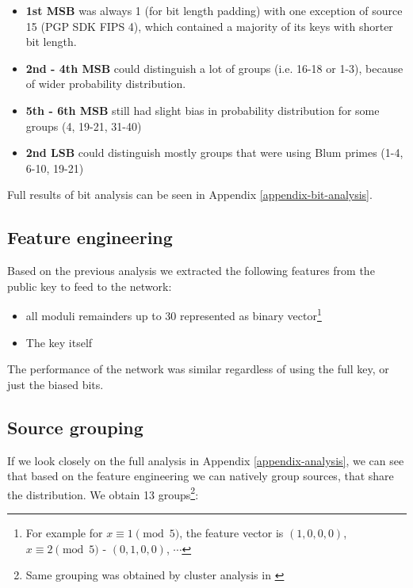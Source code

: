 \begin{itemize}

\item \textbf{1st MSB} was always 1 (for bit length padding) with one exception of source 15 (PGP SDK FIPS 4), which contained a majority of its keys with shorter bit length.

\item \textbf{2nd - 4th MSB} could distinguish a lot of groups (i.e. 16-18 or 1-3), because of wider probability distribution.

\item \textbf{5th - 6th MSB} still had slight bias in probability distribution for some groups (4, 19-21, 31-40)

\item \textbf{2nd LSB} could distinguish mostly groups that were using Blum primes (1-4, 6-10, 19-21)

\end{itemize}

\noindent
Full results of bit analysis can be seen in Appendix \ref{appendix-bit-analysis}.

\subsection{Feature engineering}

\label{feature-engineering}

Based on the previous analysis we extracted the following features from the public key to feed to the network:

\begin{itemize}

\item all moduli remainders up to 30 represented as binary vector\footnote{For example for $x \equiv 1 \pmod{5}$, the feature vector is $(1,0,0,0)$, $x \equiv 2 \pmod{5}$ - $(0,1,0,0)$, $\cdots$}

\item The key itself

\end{itemize}

\noindent
The performance of the network was similar regardless of using the full key, or just the biased bits.

\subsection{Source grouping}
If we look closely on the full analysis in Appendix \ref{appendix-analysis}, we can see that based on the feature engineering we can natively group sources, that share the distribution. We obtain 13 groups\footnote{Same grouping was obtained by cluster analysis in \cite{svenda_1}}:

